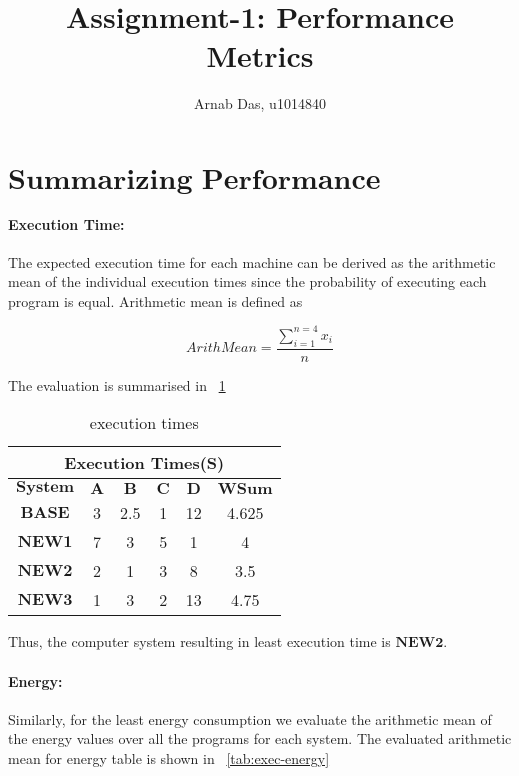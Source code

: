 \documentclass{tufte-handout}
\title{Assignment-1: Performance Metrics}
\author[]{Arnab Das, u1014840}
\begin{document}
  
  \maketitle%
  

 \setcounter{secnumdepth}{1}

\newpage
\section{$\textbf{Summarizing Performance Numbers}$}
	\paragraph{Execution Time:} The expected execution time for each machine can be derived as the arithmetic mean of the individual execution times since the probability of executing each program is equal. Arithmetic mean is defined as 
	
	  \[
	  	ArithMean = \dfrac{\sum_{i=1}^{n=4} x_i}{n}
	  \]

	The evaluation is summarised in ~\ref{tab:exec-time}

	\begin{table}[!htb]
	    \centering
	    \selectfont
		\renewcommand{\arraystretch}{3.0}
		\label{tab:exec-time}
	    \begin{tabular}{c|c|c|c|c|c}
	      \toprule
		  \multicolumn{6}{|c|}{Execution Times(S)}  \\
	      \midrule 
		  $\textbf{System}$ & $\textbf{A}$ & $\textbf{B}$ & $\textbf{C}$ & $\textbf{D}$ & $\textbf{WSum}$ \\  %
		  $\textbf{BASE}$ & 3 & 2.5 & 1 & 12 & 4.625 \\
		  $\textbf{NEW1}$ & 7 & 3 & 5 & 1 & 4 \\
		  $\textbf{NEW2}$ & 2 & 1 & 3 & 8 & 3.5 \\
		  $\textbf{NEW3}$ & 1 & 3 & 2 & 13 & 4.75 \\
	      \bottomrule
	    \end{tabular}
	    \caption{ execution times }
	  \end{table}

	  Thus, the computer system resulting in least execution time is $\textbf{NEW2}$.
	

	  \paragraph{Energy: } Similarly, for the least energy consumption we evaluate the arithmetic mean of the energy values over all the programs for each system. The evaluated  arithmetic mean for energy table is shown in ~\ref{tab:exec-energy} 
	  
\end{document}
